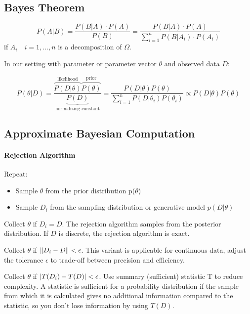 \documentclass[11pt]{article}
\DeclarePairedDelimiter\abs{\lvert}{\rvert}
\DeclarePairedDelimiter\norm{\lVert}{\rVert}
\begin{document}
\subsection{Bayes Theorem}
\begin{equation*}
	P(A|B) = \frac{P(B|A)\cdot P(A)}{P(B)} = \frac{P(B|A)\cdot P(A)}{\sum_{i=1}^{n}P(B|A_i)\cdot P(A_i)}
\end{equation*}
if $A_i \quad i=1,...,n$ is a decomposition of $\Omega$.

In our setting with parameter or parameter vector $\theta$ and observed data $D$:

\begin{equation*}
	P(\theta|D) = \frac{\overbrace{P(D|\theta)}^{\text{likelihood}}\overbrace{P(\theta)}^{\text{prior}}}{\underbrace{P(D)}_{\text{normalizing constant}}} = \frac{P(D|\theta)P(\theta)}{\sum_{i=1}^{n}P(D|\theta_i)P(\theta_i)}\propto P(D|\theta)P(\theta)
\end{equation*}

\subsection{Approximate Bayesian Computation}
\paragraph{Rejection Algorithm} Repeat:
\begin{itemize}
	\item Sample $\theta$ from the prior distribution p($\theta$)
	\item Sample $D_i$ from the sampling distribution or generative model $p(D|\theta)$
\end{itemize}
\noindent
Collect $\theta$ if $D_i = D$. The rejection algorithm samples from the posterior distribution. If $D$ is discrete, the rejection algorithm is exact.

\vspace{1em}
\noindent
Collect $\theta$ if $\norm{D_i - D} < \epsilon$. This variant is applicable for continuous data, adjust the tolerance $\epsilon$ to trade-off between precision and efficiency.

\vspace{1em}
\noindent
Collect $\theta$ if $\abs{T(D_i ) - T(D)} < \epsilon$. Use summary (sufficient) statistic T to reduce complexity. A statistic is sufficient for a probability distribution if the sample from which it is calculated gives no additional information compared to the statistic, so you don't lose information by using $T(D)$.
\end{document}
